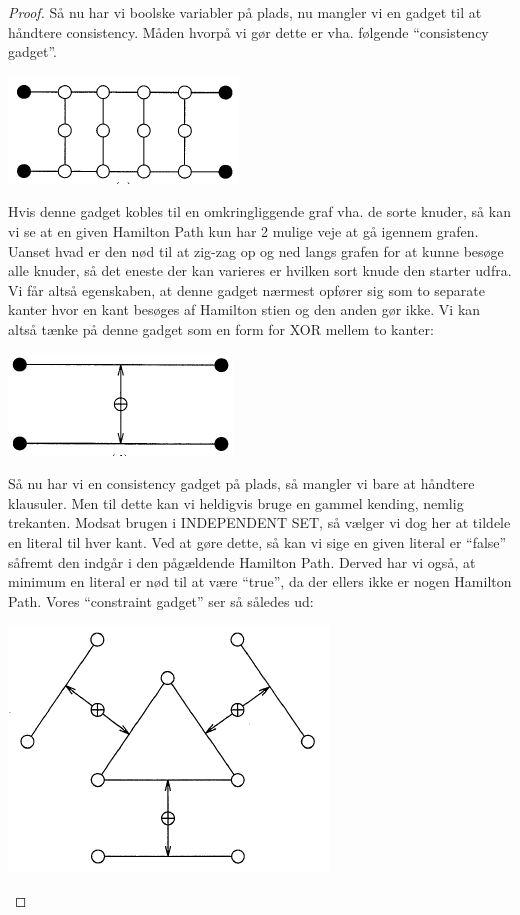 \begin{proof}
Så nu har vi boolske variabler på plads, nu mangler vi en gadget til at håndtere consistency. Måden hvorpå vi gør dette er vha. følgende ``consistency gadget''.
\begin{center}
 \includegraphics[bb=0 0 173 81]{./consistencyGadget.png}
\end{center}
Hvis denne gadget kobles til en omkringliggende graf vha. de sorte knuder, så kan vi se at en given Hamilton Path kun har 2 mulige veje at gå igennem grafen. Uanset hvad er den nød til at zig-zag op og ned langs grafen for at kunne besøge alle knuder, så det eneste der kan varieres er hvilken sort knude den starter udfra. Vi får altså egenskaben, at denne gadget nærmest opfører sig som to separate kanter hvor en kant besøges af Hamilton stien og den anden gør ikke. Vi kan altså tænke på denne gadget som en form for XOR mellem to kanter:
\begin{center}
 \includegraphics[bb=0 0 173 81]{./consistencyGadget2.png}
\end{center}
Så nu har vi en consistency gadget på plads, så mangler vi bare at håndtere klausuler. Men til dette kan vi heldigvis bruge en gammel kending, nemlig trekanten. Modsat brugen i INDEPENDENT SET, så vælger vi dog her at tildele en literal til hver kant. Ved at gøre dette, så kan vi sige en given literal er ``false'' såfremt den indgår i den pågældende Hamilton Path. Derved har vi også, at minimum en literal er nød til at være ``true'', da der ellers ikke er nogen Hamilton Path. Vores ``constraint gadget'' ser så således ud:
\begin{center}
 \includegraphics[bb=0 0 241 185]{./constraintGadget.png}

\end{center}
\end{proof}
